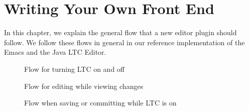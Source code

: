 \chapter{Writing Your Own Front End} \label{ch:plugins}

In this chapter, we explain the general flow that a new editor plugin should follow.  We follow these flows in general in our reference implementation of the Emacs  and the Java LTC Editor.

\begin{figure}
\centering
{}
\caption{Flow for turning LTC on and off} \label{fig:flow-LTC-on-off}
\end{figure}

\begin{figure}
\centering
{}
\caption{Flow for editing while viewing changes} \label{fig:flow-LTC-edit}
\end{figure}

\begin{figure}
\centering
{}
\caption{Flow when saving or committing while LTC is on} \label{fig:flow-LTC-save-commit}
\end{figure}
